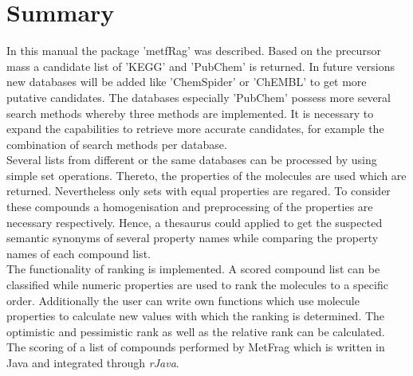 \documentclass[12pt, a4paper]{scrartcl}\usepackage[]{graphicx}\usepackage[]{color}
\begin{document}
\newpage
\section{Summary}
In this manual the package 'metfRag' was described. Based on the precursor mass a candidate list of 
'KEGG' and 'PubChem' is returned. In future versions new databases will be added like 'ChemSpider'
or 'ChEMBL' to get more putative candidates. The databases especially 'PubChem' possess more several 
search methods whereby three methods are implemented. It is necessary to expand the 
capabilities to retrieve more accurate candidates, for example the combination of search methods per database.
\\[0.5em]
Several lists from different or the same databases can be processed by using simple set operations.
Thereto, the properties of the molecules are used which are returned. Nevertheless only sets with equal
properties are regared. To consider these compounds a homogenisation and preprocessing 
of the properties are necessary respectively. Hence, a thesaurus could applied to get the
suspected semantic synonyms of several property names while comparing the property names of 
each compound list. \\[0.5em]
The functionality of ranking is implemented. A scored compound list can be classified while 
numeric properties are used to rank the molecules to a specific order. Additionally the user
can write own functions which use molecule properties to calculate new values with which 
the ranking is determined. The optimistic and pessimistic rank as well 
as the relative rank can be calculated. \\[0.5em]
The scoring of a list of compounds performed by MetFrag which is written in Java and
integrated through \emph{rJava}.

\newpage
\printbibliography
\end{document}
